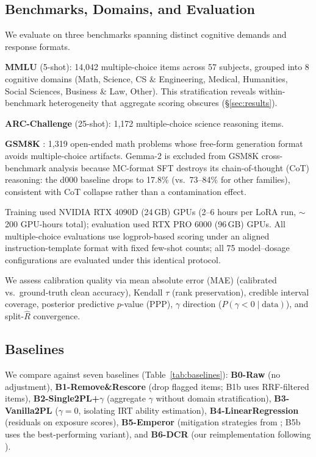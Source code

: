 \subsection{Benchmarks, Domains, and Evaluation}
\label{sec:benchmarks}

We evaluate on three benchmarks spanning distinct cognitive demands and response formats.

\textbf{MMLU} \citep{hendrycks2021mmlu} (5-shot): 14,042 multiple-choice items across 57 subjects, grouped into 8 cognitive domains (Math, Science, CS \& Engineering, Medical, Humanities, Social Sciences, Business \& Law, Other). This stratification reveals within-benchmark heterogeneity that aggregate scoring obscures (\S\ref{sec:results}).

\textbf{ARC-Challenge} \citep{clark2018arc} (25-shot): 1,172 multiple-choice science reasoning items.

\textbf{GSM8K} \citep{cobbe2021gsm8k}: 1,319 open-ended math problems whose free-form generation format avoids multiple-choice artifacts. Gemma-2 is excluded from GSM8K cross-benchmark analysis because MC-format SFT destroys its chain-of-thought (CoT) reasoning: the d000 baseline drops to 17.8\% (vs.\ 73--84\% for other families), consistent with CoT collapse rather than a contamination effect.

Training used NVIDIA RTX 4090D (24\,GB) GPUs (2--6 hours per LoRA run, ${\sim}$200 GPU-hours total); evaluation used RTX PRO 6000 (96\,GB) GPUs. All multiple-choice evaluations use logprob-based scoring under an aligned instruction-template format with fixed few-shot counts; all 75 model--dosage configurations are evaluated under this identical protocol.

We assess calibration quality via mean absolute error (MAE) (calibrated vs.\ ground-truth clean accuracy), Kendall $\tau$ (rank preservation), credible interval coverage, posterior predictive $p$-value (PPP), $\gamma$ direction ($P(\gamma\!<\!0 \mid \text{data})$), and split-$\hat{R}$ convergence.

\subsection{Baselines}
\label{sec:baselines}

We compare against seven baselines (Table~\ref{tab:baselines}): \textbf{B0-Raw} (no adjustment), \textbf{B1-Remove\&Rescore} (drop flagged items; B1b uses RRF-filtered items), \textbf{B2-Single2PL+$\gamma$} (aggregate $\gamma$ without domain stratification), \textbf{B3-Vanilla2PL} ($\gamma=0$, isolating IRT ability estimation), \textbf{B4-LinearRegression} (residuals on exposure scores), \textbf{B5-Emperor} (mitigation strategies from \citet{sun2025emperor}; B5b uses the best-performing variant), and \textbf{B6-DCR} (our reimplementation following \citealp{xu2025dcr}).

